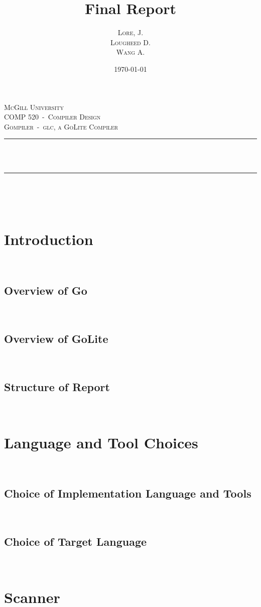 \documentclass[11pt]{article}
\author{\textsc{Lore}, J.\\ \textsc{Lougheed} D.\\ \textsc{Wang} A.}
\date{\today}
\title{Final Report}
\newcommand{\HRule}{\rule{\linewidth}{0.5mm}}
\begin{document}
\begin{titlepage}
	\center%

	\textsc{\LARGE McGill University}\\[1.5cm]
	\textsc{\Large COMP 520~-~Compiler Design}\\[0.5cm]
	\textsc{\large Gompiler~-~glc, a GoLite Compiler}\\[0.5cm]

	\HRule~\\[0.4cm]
	{ \huge \bfseries \thetitle}\\[0.4cm]
	\HRule~\\[1.5cm]

	\theauthor\\%
	[3cm]

	{\large \thedate}\\[2cm]

	\vfill

\end{titlepage}
\tableofcontents
\section{Introduction}~%
\subsection{Overview of Go}~%
\subsection{Overview of GoLite}~%
\subsection{Structure of Report}~%
\section{Language and Tool Choices}~%
\subsection{Choice of Implementation Language and Tools}~%
\subsection{Choice of Target Language}~%
\section{Scanner}~%
\end{document}
